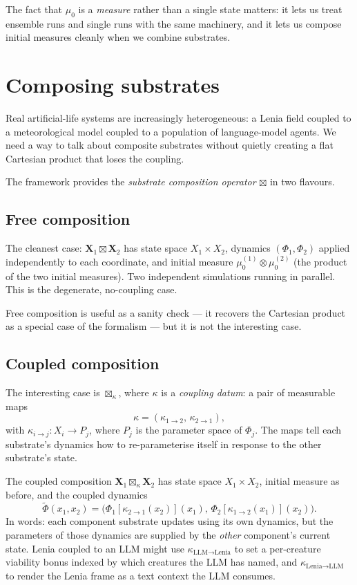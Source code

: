 The fact that $\mu_0$ is a \emph{measure} rather than a single state
matters: it lets us treat ensemble runs and single runs with the same
machinery, and it lets us compose initial measures cleanly when we
combine substrates.

\section{Composing substrates}

Real artificial-life systems are increasingly heterogeneous: a Lenia
field coupled to a meteorological model coupled to a population of
language-model agents. We need a way to talk about composite substrates
without quietly creating a flat Cartesian product that loses the
coupling.

The framework provides the \emph{substrate composition operator}
$\boxtimes$ in two flavours.

\subsection*{Free composition}

The cleanest case: $\mathbf{X}_1 \boxtimes \mathbf{X}_2$ has state space
$X_1 \times X_2$, dynamics $(\Phi_1, \Phi_2)$ applied independently to
each coordinate, and initial measure $\mu_0^{(1)} \otimes \mu_0^{(2)}$
(the product of the two initial measures). Two independent simulations
running in parallel. This is the degenerate, no-coupling case.

Free composition is useful as a sanity check --- it recovers the
Cartesian product as a special case of the formalism --- but it is not
the interesting case.

\subsection*{Coupled composition}

The interesting case is $\boxtimes_\kappa$, where $\kappa$ is a
\emph{coupling datum}: a pair of measurable maps
\[
  \kappa = (\kappa_{1 \to 2},\, \kappa_{2 \to 1}),
\]
with $\kappa_{i \to j}: X_i \to P_j$, where $P_j$ is the parameter
space of $\Phi_j$. The maps tell each substrate's dynamics how to
re-parameterise itself in response to the other substrate's state.

The coupled composition $\mathbf{X}_1 \boxtimes_\kappa \mathbf{X}_2$ has
state space $X_1 \times X_2$, initial measure as before, and the
coupled dynamics
\[
  \widetilde\Phi(x_1, x_2) =
  \big(\Phi_1[\kappa_{2\to 1}(x_2)](x_1),\,
       \Phi_2[\kappa_{1\to 2}(x_1)](x_2)\big).
\]
In words: each component substrate updates using its own dynamics, but
the parameters of those dynamics are supplied by the \emph{other}
component's current state. Lenia coupled to an LLM might use
$\kappa_{\text{LLM} \to \text{Lenia}}$ to set a per-creature viability
bonus indexed by which creatures the LLM has named, and
$\kappa_{\text{Lenia} \to \text{LLM}}$ to render the Lenia frame as a
text context the LLM consumes.

